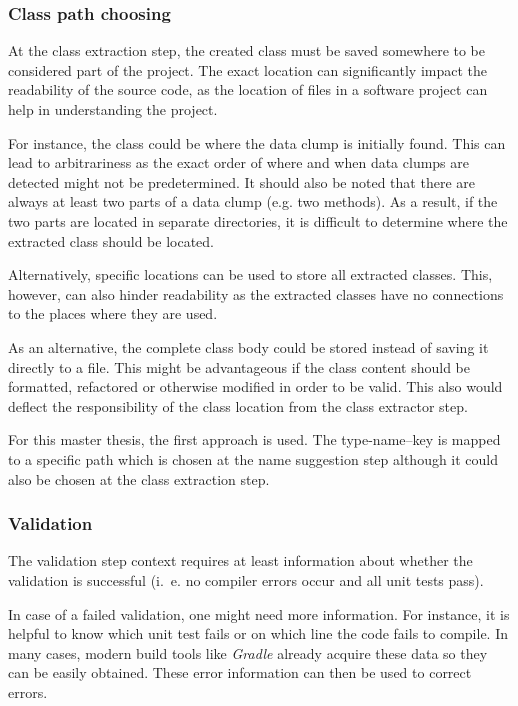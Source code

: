 \subsubsection{Class path choosing}

At the class extraction step, the created class must be saved somewhere to be considered part of the project. The exact location can significantly impact the readability of the source code, as the location of files in a software project can help in understanding the project. 

For instance, the class could be where the data clump is initially found. This can lead to arbitrariness as the exact order of where and when data clumps are detected might not be predetermined. It should also be noted that there are always at least two parts of a data clump (e.g. two methods). As a result, if the two parts are located in separate directories, it is difficult to determine where the extracted class should be located. 

Alternatively, specific locations can be used to store all extracted classes. This, however, can also hinder readability as the extracted classes have no connections to the places where they are used. 

As an alternative, the complete class body could be stored instead of saving it directly to a file. This might be advantageous if the class content should be formatted, refactored or otherwise modified in order to be valid. This also would deflect the responsibility of the class location from the class extractor step. 

For this master thesis, the first approach is used. The type-name--key is mapped to a specific path which is chosen at the name suggestion step although it could also be chosen at the class extraction step. 

 
\subsubsection{Validation}

The validation step context requires at least information about whether the validation is successful (i.~e. no compiler errors occur and all unit tests pass). 

In case of a failed validation, one might need more information. For instance, it is helpful to know which unit test fails or on which line the code fails to compile. In many cases, modern build tools like \textit{Gradle} already acquire these data so they can be easily obtained. These error information can then be used to correct errors. 




